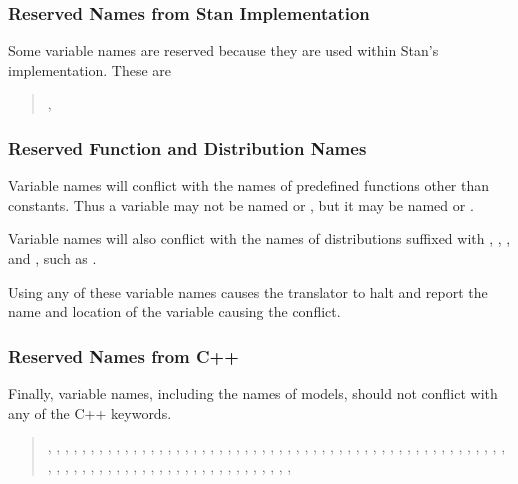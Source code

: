\subsubsection{Reserved Names from Stan Implementation}

Some variable names are reserved because they are used within
Stan's \Cpp implementation.  These are
%
\begin{quote}
,
\end{quote}
%

\subsubsection{Reserved Function and Distribution Names}

Variable names will conflict with the names of predefined functions
other than constants.  Thus a variable may not be named 
or , but it may be named  or .

Variable names will also conflict with the names of distributions
suffixed with , , ,
and , such as .

Using any of these variable names causes the  translator
to halt and report the name and location of the variable causing the
conflict.


\subsubsection{Reserved Names from C++}

Finally, variable names, including the names of models, should not
conflict with any of the C++ keywords.
%
\begin{quote}
,
,
,
,
,
,
,
,
,
,
,
,
,
,
,
,
,
,
,
,
,
,
,
,
,
,
,
,
,
,
,
,
,
,
,
,
,
,
,
,
,
,
,
,
,
,
,
,
,
,
,
,
,
,
,
,
,
,
,
,
,
,
,
,
,
,
,
,
,
,
,
,
,
,
,
,
,
,
,
,
,
,
,
\end{quote}

